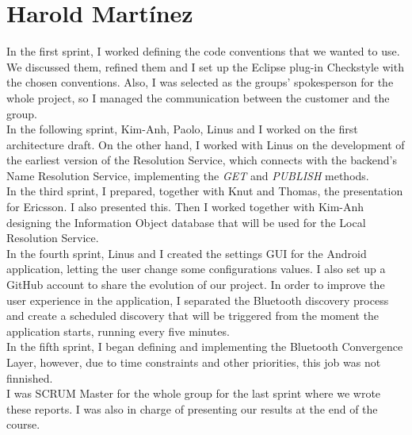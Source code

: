 \section{Harold Martínez}

In the first sprint, I worked defining the code conventions that we wanted to use. 
We discussed them, refined them and I set up the Eclipse plug-in Checkstyle with the chosen conventions.
Also, I was selected as the groups' spokesperson for the whole project, so I managed the communication 
between the customer and the group.\\

In the following sprint, Kim-Anh, Paolo, Linus and I worked on the first architecture draft. On the other hand,
I worked with Linus on the development of the earliest version of the Resolution Service, which connects with the 
backend's Name Resolution Service, implementing the \emph{GET} and \emph{PUBLISH} methods.\\

In the third sprint, I prepared, together with Knut and Thomas, the presentation for Ericsson. I also presented this. 
Then I worked together with Kim-Anh designing the Information Object database that will be used for the 
Local Resolution Service.\\

In the fourth sprint, Linus and I created the settings GUI for the Android application, letting the user change 
some configurations values. I also set up a GitHub account to share the evolution of our project. In order to improve 
the user experience in the application, I separated the Bluetooth discovery process and create a scheduled discovery that 
will be triggered from the moment the application starts, running every five minutes.\\

In the fifth sprint, I began defining and implementing the Bluetooth Convergence Layer, however, due to time constraints 
and other priorities, this job was not finnished. \\

I was SCRUM Master for the whole group for the last sprint where we wrote these reports. I was also in charge of presenting 
our results at the end of the course.\\

